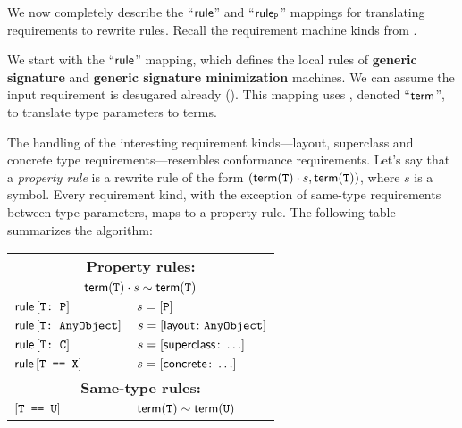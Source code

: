\documentclass[../generics]{subfiles}
\begin{document}
We now completely describe the ``$\mathsf{rule}$'' and ``$\mathsf{rule}_{\texttt{P}}$'' mappings for translating requirements to rewrite rules. Recall the requirement machine kinds from .

We start with the ``$\mathsf{rule}$'' mapping, which defines the local rules of \textbf{generic signature} and \textbf{generic signature minimization} machines. We can assume the input requirement is desugared already (). This mapping uses , denoted ``$\mathsf{term}$'', to translate type parameters to terms.

The handling of the interesting requirement kinds---layout, superclass and concrete type requirements---resembles conformance requirements. Let's say that a \emph{property rule} is a rewrite rule of the form $(\mathsf{term}(\texttt{T})\cdot s,\mathsf{term}(\texttt{T}))$, where $s$ is a symbol. Every requirement kind, with the exception of same-type requirements between type parameters, maps to a property rule. The following table summarizes the algorithm:

\begin{center}
\begin{tabular}{ll}
\toprule
\multicolumn{2}{c}{\textbf{Property rules:}}\\
\multicolumn{2}{c}{$\mathsf{term}(\texttt{T})\cdot s \sim \mathsf{term}(\texttt{T})$}\\
\midrule
$\mathsf{rule}\, [\texttt{T:~P}]$ & $s=[\texttt{P}]$\\
$\mathsf{rule}\, [\texttt{T:~AnyObject}]$ & $s=[\mathsf{layout}\colon\texttt{AnyObject}]$\\
$\mathsf{rule}\, [\texttt{T:~C}]$ & $s=[\mathsf{superclass}\colon \ldots]$\\
$\mathsf{rule}\, [\texttt{T == X}]$ & $s=[\mathsf{concrete}\colon \ldots]$\\
\midrule
\multicolumn{2}{c}{\textbf{Same-type rules:}}\\
$[\texttt{T == U}]$ & $\mathsf{term}(\texttt{T})\sim\mathsf{term}(\texttt{U})$\\
\bottomrule
\end{tabular}
\end{center}
\end{document}
